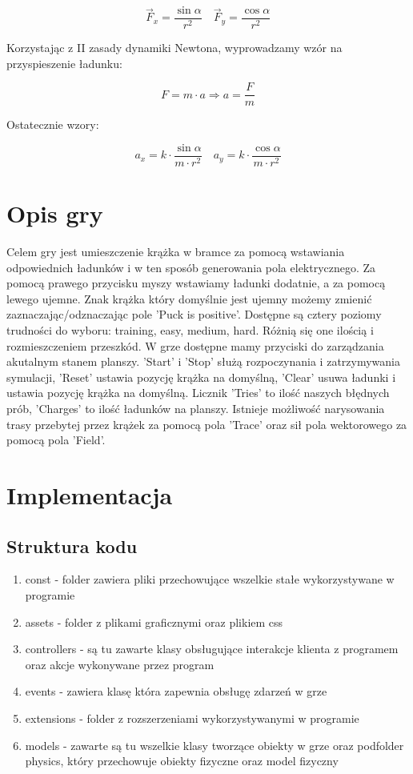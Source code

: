 \documentclass{article}
\begin{document}
$$
\vec{F}_{x}=\frac{\sin \alpha}{r^{2}} \quad \vec{F}_{y}=\frac{\cos \alpha}{r^{2}}
$$

\noindent Korzystając z II zasady dynamiki Newtona, wyprowadzamy wzór na przyspieszenie ładunku:

$$
F=m \cdot a \Rightarrow a=\frac{F}{m}
$$

\noindent Ostatecznie wzory:

$$
a_{x}=k \cdot \frac{\sin \alpha}{m \cdot r^{2}} \quad a_{y}=k \cdot \frac{\cos \alpha}{m \cdot r^{2}}
$$

\section{Opis gry}
Celem gry jest umieszczenie krążka w bramce za pomocą wstawiania odpowiednich ładunków i w ten sposób generowania pola elektrycznego. Za pomocą prawego przycisku myszy wstawiamy ładunki dodatnie, a za pomocą lewego ujemne. Znak krążka który domyślnie jest ujemny możemy zmienić zaznaczając/odznaczając pole 'Puck is positive'. Dostępne są cztery poziomy trudności do wyboru: training, easy, medium, hard. Różnią się one ilością i rozmieszczeniem przeszkód.
W grze dostępne mamy przyciski do zarządzania akutalnym stanem planszy. 'Start' i 'Stop' służą rozpoczynania i zatrzymywania symulacji, 'Reset' ustawia pozycję krążka na domyślną, 'Clear' usuwa ładunki i ustawia pozycję krążka na domyślną. Licznik 'Tries' to ilość naszych błędnych prób, 'Charges' to ilość ładunków na planszy. Istnieje możliwość narysowania trasy przebytej przez krążek za pomocą pola 'Trace' oraz sił pola wektorowego za pomocą pola 'Field'. 

\section{Implementacja}
\subsection{Struktura kodu}
\begin{enumerate}
    \item const - folder zawiera pliki przechowujące wszelkie stałe wykorzystywane w programie
    \item assets - folder z plikami graficznymi oraz plikiem css
    \item controllers - są tu zawarte klasy obsługujące interakcje klienta z programem oraz akcje wykonywane przez program
    \item events - zawiera klasę która zapewnia obsługę zdarzeń w grze
    \item extensions - folder z rozszerzeniami wykorzystywanymi w programie
    \item models - zawarte są tu wszelkie klasy tworzące obiekty w grze oraz podfolder physics, który przechowuje obiekty fizyczne oraz model fizyczny
\end{enumerate}
\end{document}
